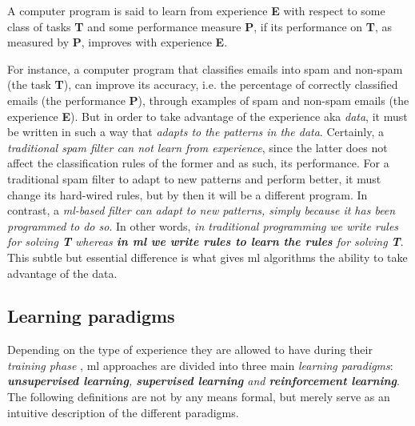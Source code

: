 \begin{definition}[name={Machine learning, \cite{mitchell}}]
	A computer program is said to learn from experience
	\textbf{E} with respect to some class of tasks \textbf{T} and some
	performance measure \textbf{P}, if its
	performance on \textbf{T}, as measured by \textbf{P}, improves with
	experience \textbf{E}.
\end{definition}

For instance, a computer program that classifies emails into
spam and non-spam (the task \textbf{T}), can improve its accuracy, i.e. the
percentage of correctly classified emails (the performance \textbf{P}), through
examples of spam and non-spam emails (the experience \textbf{E}). But in order
to take advantage of the experience aka \emph{data}, it must be
written in such a way that \emph{adapts to the patterns in the data}. Certainly,
a \emph{traditional spam filter can not learn from experience}, since the latter
does not affect the classification rules of the former and as such, its
performance. For a traditional spam filter to adapt to new patterns and perform
better, it must change its hard-wired rules, but by then it will be a different
program. In contrast, a \emph{\gls{ml}-based filter can adapt to new patterns,
simply because it has been programmed to do so}. In other words, \emph{in
traditional programming we write rules for
solving \textbf{T} whereas \textbf{in \gls{ml} we write rules to learn the
rules} for solving \textbf{T}}. This subtle but essential difference is what
gives \gls{ml} algorithms the ability to take advantage of the data.

\subsection{Learning paradigms}
\label{subsec:paradigms}

Depending on the type of experience they are allowed to have during their
\emph{training phase} \parencite{deeplearning}, \gls{ml}
approaches are divided into three main \emph{learning paradigms}: \emph{\textbf{unsupervised learning},
\textbf{supervised learning} and
\textbf{reinforcement learning}}. The following
definitions are not by any means formal, but merely serve as an intuitive
description of the different paradigms.

